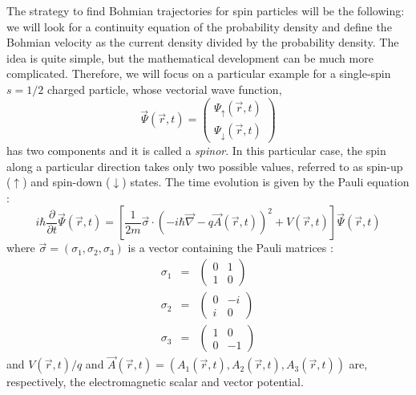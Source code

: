 \documentclass[onecolumn,nofootinbib, secnumarabic, amsmath, nobibnotes,11pt,aps,pra]{revtex4-1}
\begin{document}
The strategy to find Bohmian trajectories for spin particles will be the following: we will look for a continuity equation of the probability density and define the Bohmian velocity as the current density divided by the probability density.
The idea is quite simple, but the mathematical development can be much more complicated. Therefore, we will focus on a particular example for a single-spin $s = 1/2$ charged particle, whose vectorial wave function,
\begin{equation}
\vec \Psi(\vec r,t) = \left(
\begin{array}{c}
\Psi_{\uparrow}(\vec r,t) \\ \Psi_{\downarrow}(\vec r,t)
\end{array}
\right)
\end{equation}
has two components and it is called a \textit{spinor}. In this particular case, the spin along a particular direction takes only two possible values, referred to as spin-up ($\uparrow$) and spin-down ($\downarrow$) states.
The time evolution is given by the Pauli equation \cite{om.ward}:
\begin{equation}
\label{om.pauli}
i \hbar \frac{ \partial}{\partial t} \vec \Psi(\vec r,t) =
\left[ \frac{1}{2m} \vec{\sigma} \cdot \left(- i \hbar \vec{\nabla} - q \vec{A} (\vec r,t) \right) ^2 + V(\vec r,t) \right]
\vec \Psi(\vec r,t)
\end{equation}
where $\vec{\sigma} = (\sigma_1, \sigma_2, \sigma_3)$ is a vector containing the Pauli matrices \cite{om.landaulif}:
\begin{eqnarray}
\sigma_1 & = & \begin{pmatrix} 0&1 \\ 1&0 \end{pmatrix}  \\
\sigma_2 & = & \begin{pmatrix} 0&-i \\ i&0 \end{pmatrix} \\
\sigma_3 & = & \begin{pmatrix} 1&0 \\ 0&-1 \end{pmatrix}
\end{eqnarray}
and $V(\vec r,t)/q$ and $\vec{A}(\vec r,t) = (A_1(\vec r,t),A_2(\vec r,t),A_3(\vec r,t))$ are, respectively, the electromagnetic scalar and vector potential.
\end{document}
